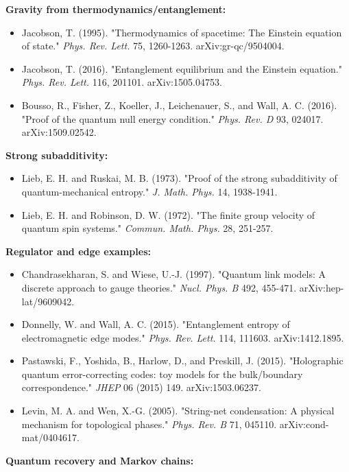 \textbf{Gravity from thermodynamics/entanglement:}

\begin{itemize}
\tightlist
\item
  Jacobson, T. (1995). "Thermodynamics of spacetime: The Einstein equation of state." \emph{Phys. Rev. Lett.} 75, 1260-1263. arXiv:gr-qc/9504004.
\item
  Jacobson, T. (2016). "Entanglement equilibrium and the Einstein equation." \emph{Phys. Rev. Lett.} 116, 201101. arXiv:1505.04753.
\item
  Bousso, R., Fisher, Z., Koeller, J., Leichenauer, S., and Wall, A. C. (2016). "Proof of the quantum null energy condition." \emph{Phys. Rev. D} 93, 024017. arXiv:1509.02542.
\end{itemize}

\textbf{Strong subadditivity:}

\begin{itemize}
\tightlist
\item
  Lieb, E. H. and Ruskai, M. B. (1973). "Proof of the strong subadditivity of quantum-mechanical entropy." \emph{J. Math. Phys.} 14, 1938-1941.
\item
  Lieb, E. H. and Robinson, D. W. (1972). "The finite group velocity of quantum spin systems." \emph{Commun. Math. Phys.} 28, 251-257.
\end{itemize}

\textbf{Regulator and edge examples:}

\begin{itemize}
\tightlist
\item
  Chandrasekharan, S. and Wiese, U.-J. (1997). "Quantum link models: A discrete approach to gauge theories." \emph{Nucl. Phys. B} 492, 455-471. arXiv:hep-lat/9609042.
\item
  Donnelly, W. and Wall, A. C. (2015). "Entanglement entropy of electromagnetic edge modes." \emph{Phys. Rev. Lett.} 114, 111603. arXiv:1412.1895.
\item
  Pastawski, F., Yoshida, B., Harlow, D., and Preskill, J. (2015). "Holographic quantum error-correcting codes: toy models for the bulk/boundary correspondence." \emph{JHEP} 06 (2015) 149. arXiv:1503.06237.
\item
  Levin, M. A. and Wen, X.-G. (2005). "String-net condensation: A physical mechanism for topological phases." \emph{Phys. Rev. B} 71, 045110. arXiv:cond-mat/0404617.
\end{itemize}

\textbf{Quantum recovery and Markov chains:}

